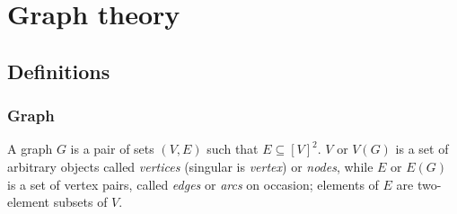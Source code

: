 \section{Graph theory}

  \subsection{Definitions}
        
    \subsubsection{Graph}

      A graph $G$ is a pair of sets $(V, E)$ such that $E \subseteq [V]^2$. $V$ or $V(G)$ is a set of arbitrary objects called \emph{vertices} (singular is \emph{vertex}) or \emph{nodes}, while $E$ or $E(G)$ is a set of vertex pairs, called \emph{edges} or \emph{arcs} on occasion; elements of $E$ are two-element subsets of $V$\cite{Diestel2012}.
      
